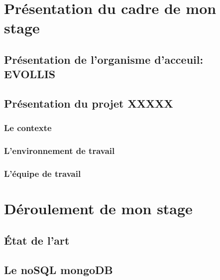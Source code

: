 \documentclass[12pt]{report}
\begin{document}




\begin{abstract}
  
\end{abstract}

\tableofcontents
\listoffigures
\listoftables





\part{Présentation du cadre de mon stage}

\chapter{Présentation de l'organisme d'acceuil: {\bf EVOLLIS}}


\chapter{Présentation du projet XXXXX}
\section{Le contexte}
\section{L'environnement de travail}
\section{L'équipe de travail}

\part{Déroulement de mon stage}
\chapter{État de l'art}

\chapter{Le noSQL mongoDB}

\end{document}
